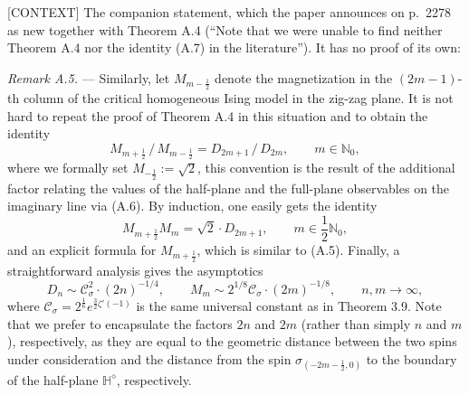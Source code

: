 \documentclass[11pt]{article}
\newcommand{\HHd}{\mathbb{H}^{\diamond}}
\begin{document}

\textsf{[CONTEXT]} The companion statement, which the paper announces on p.~2278 as new
together with Theorem A.4 (``Note that we were unable to find neither Theorem A.4 nor
the identity (A.7) in the literature''). It has no proof of its own:

\medskip
\noindent\emph{Remark A.5.} --- Similarly, let $M_{m-\frac12}$ denote the magnetization
in the $(2m-1)$-th column of the critical homogeneous Ising model in the zig-zag plane.
It is not hard to repeat the proof of Theorem A.4 in this situation and to obtain the
identity
\[
  M_{m+\frac12}\,/\,M_{m-\frac12} = D_{2m+1}\,/\,D_{2m},\qquad m\in\mathbb{N}_0,
\]
where we formally set $M_{-\frac12}:=\sqrt2$, this convention is the result of the
additional factor relating the values of the half-plane and the full-plane observables
on the imaginary line via (A.6). By induction, one easily gets the identity
\begin{equation}
  \tag{A.7}
  M_{m+\frac12}M_m = \sqrt2\cdot D_{2m+1},\qquad m\in\frac12\mathbb{N}_0,
\end{equation}
and an explicit formula for $M_{m+\frac12}$, which is similar to (A.5). Finally, a
straightforward analysis gives the asymptotics
\begin{equation}
  \tag{A.8}
  D_n \sim \mathcal{C}_{\sigma}^{2}\cdot(2n)^{-1/4},\qquad
  M_m \sim 2^{1/8}\mathcal{C}_{\sigma}\cdot(2m)^{-1/8},\qquad n,m\to\infty,
\end{equation}
where $\mathcal{C}_{\sigma}=2^{\frac16}e^{\frac32\zeta'(-1)}$ is the same universal
constant as in Theorem 3.9. Note that we prefer to encapsulate the factors $2n$ and
$2m$ (rather than simply $n$ and $m$), respectively, as they are equal to the geometric
distance between the two spins under consideration and the distance from the spin
$\sigma_{(-2m-\frac12,0)}$ to the boundary of the half-plane $\HHd$, respectively.

\end{document}
